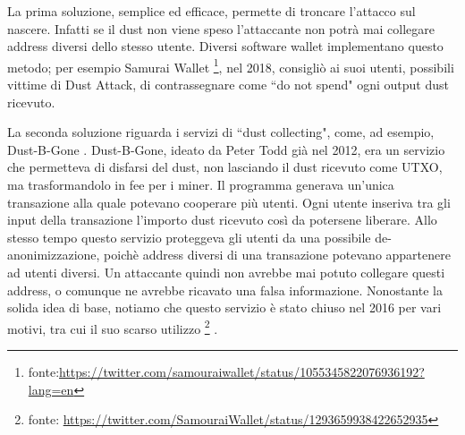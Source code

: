 La prima soluzione, semplice ed efficace, permette di troncare l'attacco sul nascere. Infatti se il dust non viene speso l'attaccante non potrà mai collegare address diversi dello stesso utente.  Diversi software wallet implementano questo metodo; per esempio Samurai Wallet \footnote{fonte:\url{https://twitter.com/samouraiwallet/status/1055345822076936192?lang=en}}, nel 2018, consigliò ai suoi utenti, possibili vittime di Dust Attack,  di contrassegnare come ``do not spend" ogni output dust ricevuto.

La seconda soluzione riguarda i servizi di ``dust collecting", come, ad esempio, Dust-B-Gone \cite{Dbg}.
Dust-B-Gone, ideato da Peter Todd già nel 2012, era un servizio che permetteva di disfarsi del dust, non lasciando il dust ricevuto come UTXO, ma trasformandolo in fee per i miner. Il programma generava un'unica transazione alla quale potevano cooperare più utenti. Ogni utente inseriva tra gli input della transazione l'importo dust ricevuto così da potersene liberare. Allo stesso tempo questo servizio proteggeva gli utenti da una possibile de-anonimizzazione, poichè address diversi di una transazione potevano appartenere ad utenti diversi. Un attaccante quindi non avrebbe mai potuto collegare questi address, o comunque ne avrebbe ricavato una falsa informazione.
Nonostante la solida idea di base, notiamo che questo servizio è stato chiuso nel 2016 per vari motivi, tra cui il suo scarso utilizzo \footnote{fonte: \url{https://twitter.com/SamouraiWallet/status/1293659938422652935}} . 